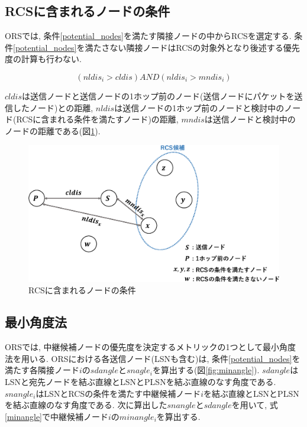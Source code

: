 \documentclass[10pt]{jreport}
\begin{document}
\subsection{RCSに含まれるノードの条件}
ORSでは, 条件\ref{potential_nodes}を満たす隣接ノードの中からRCSを選定する. 条件\ref{potential_nodes}を満たさない隣接ノードはRCSの対象外となり後述する優先度の計算も行わない.

\begin{equation}
	\label{potential_nodes}
	\left( nldis_i > cldis \right)   AND   \left( nldis_i > mndis_i \right) 
\end{equation}

$cldis$は送信ノードと送信ノードの1ホップ前のノード(送信ノードにパケットを送信したノード)との距離, $nldis$は送信ノードの1ホップ前のノードと検討中のノード(RCSに含まれる条件を満たすノード)の距離, $mndis$は送信ノードと検討中のノードの距離である(図\ref{fig:Condition_RCS}). 

\begin{figure}[!ht]
	\centering
	\includegraphics[width=150mm]{figures/Condition_RCS.eps}
	\caption{RCSに含まれるノードの条件}
	\label{fig:Condition_RCS}
\end{figure}


\subsection{最小角度法}
ORSでは, 中継候補ノードの優先度を決定するメトリックの1つとして最小角度法を用いる. ORSにおける各送信ノード(LSNも含む)は, 条件\ref{potential_nodes}を満たす各隣接ノード$i$の$sdangle$と$snagle_i$を算出する(図\ref{fig:minangle}).
$sdangle$はLSNと宛先ノードを結ぶ直線とLSNとPLSNを結ぶ直線のなす角度である. $snangle_i$はLSNとRCSの条件を満たす中継候補ノード$i$を結ぶ直線とLSNとPLSNを結ぶ直線のなす角度である. 
次に算出した$snangle$と$sdangle$を用いて, 式\ref{minangle}で中継候補ノード$i$の$minangle_i$を算出する.
\end{document}
